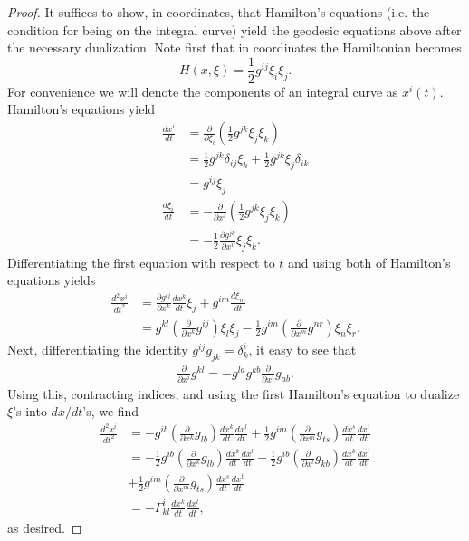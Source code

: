 \documentclass{amsart}
\begin{document}
\begin{proof}
    It suffices to show, in coordinates, that Hamilton's equations (i.e. the condition for
    being on the integral curve) yield the geodesic equations above after the necessary
    dualization. Note first that in coordinates the Hamiltonian becomes
    \begin{equation*}
        H(x,\xi) = \frac{1}{2}g^{ij}\xi_i\xi_j.
    \end{equation*}
    For convenience we will denote the components of an integral curve as $x^i(t)$. Hamilton's equations yield
    \begin{align*}
        \frac{dx^i}{dt} &= \frac{\partial}{\partial\xi_i}\left( \frac{1}{2}g^{jk}\xi_j\xi_k \right)\\
        &= \frac{1}{2}g^{jk}\delta_{ij}\xi_k + \frac{1}{2}g^{jk}\xi_j\delta_{ik}\\
        &= g^{ij}\xi_j\\
        \frac{d\xi_i}{dt} &= -\frac{\partial}{\partial x^i}\left( \frac{1}{2}g^{jk}\xi_j\xi_k \right)\\
        &=-\frac{1}{2}\frac{\partial g^{jk}}{\partial x^i}\xi_j\xi_k.
    \end{align*}
    Differentiating the first equation with respect to $t$ and using both of Hamilton's equations yields
    \begin{align*}
        \frac{d^2x^i}{dt^2} &= \frac{\partial g^{ij}}{\partial x^k}\frac{dx^k}{dt}\xi_j+g^{im}\frac{d\xi_m}{dt}\\
        &= g^{kl}\left(\frac{\partial}{\partial x^k}g^{ij}\right)\xi_l\xi_j-\frac{1}{2}g^{im}\left(\frac{\partial}{\partial x^m}g^{nr}\right)\xi_n\xi_r.
    \end{align*}
    Next, differentiating the identity $g^{ij}g_{jk}=\delta^i_k$, it easy to see that
    \begin{align*}
        \frac{\partial}{\partial x^i}g^{kl}=-g^{la}g^{kb}\frac{\partial}{\partial x^i}g_{ab}.
    \end{align*}
    Using this, contracting indices, and using the first Hamilton's equation to dualize $\xi$'s into $dx/dt$'s,
    we find
    \begin{align*}
        \frac{d^2x^i}{dt^2} &= -g^{ib}\left( \frac{\partial}{\partial x^k}g_{lb} \right)\frac{dx^k}{dt}\frac{dx^l}{dt}
        +\frac{1}{2}g^{im}\left( \frac{\partial}{\partial x^m}g_{ts} \right)\frac{dx^s}{dt}\frac{dx^t}{dt}\\
        &= -\frac{1}{2}g^{ib}\left( \frac{\partial}{\partial x^k}g_{lb} \right)\frac{dx^k}{dt}\frac{dx^l}{dt}
        -\frac{1}{2}g^{ib}\left( \frac{\partial}{\partial x^l}g_{kb} \right)\frac{dx^k}{dt}\frac{dx^l}{dt}
        \\&+\frac{1}{2}g^{im}\left( \frac{\partial}{\partial x^m}g_{ts} \right)\frac{dx^s}{dt}\frac{dx^t}{dt}\\
        &= -\Gamma_{kl}^i\frac{dx^k}{dt}\frac{dx^l}{dt},
    \end{align*}
    as desired.
\end{proof}
\end{document}
